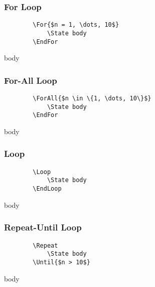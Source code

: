 \documentclass[11pt,a4paper,USenglish]{article}
\begin{document}
\subsubsection{For Loop}
\begin{minipage}[t]{0.45\textwidth}
	\begin{verbatim}
		\For{$n = 1, \dots, 10$}
		    \State body
		\EndFor
	\end{verbatim}
\end{minipage}
\hfill
\begin{minipage}[t]{0.45\textwidth}
	\begin{algorithmic}
		    \State body
		\EndFor
	\end{algorithmic}
\end{minipage}

\subsubsection{For-All Loop}
\begin{minipage}[t]{0.45\textwidth}
	\begin{verbatim}
		\ForAll{$n \in \{1, \dots, 10\}$}
		    \State body
		\EndFor
	\end{verbatim}
\end{minipage}
\hfill
\begin{minipage}[t]{0.45\textwidth}
	\begin{algorithmic}
		\ForAll{$n \in \{1, \dots, 10\}$}
		    \State body
		\EndFor
	\end{algorithmic}
\end{minipage}

\subsubsection{Loop}
\begin{minipage}[t]{0.45\textwidth}
	\begin{verbatim}
		\Loop
		    \State body
		\EndLoop
	\end{verbatim}
\end{minipage}
\hfill
\begin{minipage}[t]{0.45\textwidth}
	\begin{algorithmic}
		\Loop
		    \State body
		\EndLoop
	\end{algorithmic}
\end{minipage}

\subsubsection{Repeat-Until Loop}
\begin{minipage}[t]{0.45\textwidth}
	\begin{verbatim}
		\Repeat
		    \State body
		\Until{$n > 10$}
	\end{verbatim}
\end{minipage}
\hfill
\begin{minipage}[t]{0.45\textwidth}
	\begin{algorithmic}
		\Repeat
		    \State body
		\Until{$n > 10$}
	\end{algorithmic}
\end{minipage}
\end{document}

